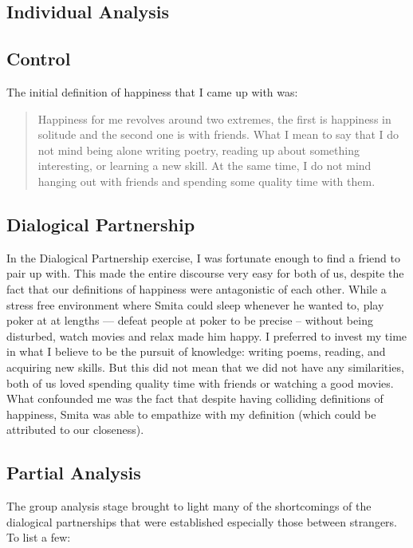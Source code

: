 \documentclass[twoside]{article}
\begin{document}
\begin{multicols}{2}

\section{Individual Analysis}

\subsection{Control}
The initial definition of happiness that I came up with was:
\begin{quotation}
    Happiness for me revolves around two extremes, the first is happiness in solitude and the second one is with
    friends. What I mean to say that I do not mind being alone writing poetry, reading up about something
    interesting, or learning a new skill. At the same time, I do not mind hanging out with friends and spending some
    quality time with them.
\end{quotation}

\subsection{Dialogical Partnership}
In the Dialogical Partnership exercise, I was fortunate enough to find a friend to pair up with.
This made the entire discourse very easy for both of us, despite the fact that our definitions
of happiness were antagonistic of each other.
While a stress free environment where Smita could sleep whenever he wanted to, play poker at
at lengths --- defeat people at poker to be precise -- without being disturbed, watch movies
and relax made him happy.
I preferred to invest my time in what I believe to be the pursuit of knowledge: writing poems, reading,
and acquiring new skills. But this did not mean that we did not have any similarities, both of 
us loved spending quality time with friends or watching a good movies. 
What confounded me  was the fact that despite having colliding definitions of happiness, Smita 
was able to empathize with my definition (which could be attributed to our closeness).

\subsection{Partial Analysis}
The group analysis stage brought to light many of the shortcomings of the dialogical partnerships
that were established especially those between strangers. To list a few:


\end{multicols}
\end{document}
